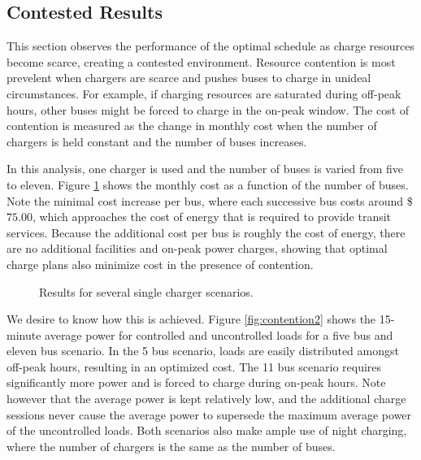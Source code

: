 \subsection{Contested Results}
This section observes the performance of the optimal schedule as charge resources become scarce, creating a contested environment. Resource contention is most prevelent when chargers are scarce and pushes buses to charge in unideal circumstances.  For example, if charging resources are saturated during off-peak hours, other buses might be forced to charge in the on-peak window. The cost of contention is measured as the change in monthly cost when the number of chargers is held constant and the number of buses increases. 
\par In this analysis, one charger is used and the number of buses is varied from five to eleven. Figure \ref{fig:contention1} shows the monthly cost as a function of the number of buses. Note the minimal cost increase per bus, where each successive bus costs around \$$75.00$, which approaches the cost of energy that is required to provide transit services.  Because the additional cost per bus is roughly the cost of energy, there are no additional facilities and on-peak power charges, showing that optimal charge plans also minimize cost in the presence of contention.
\begin{figure}
	\caption{Results for several single charger scenarios.}
	\label{fig:contention1}
\end{figure}
\par We desire to know how this is achieved. Figure \ref{fig:contention2} shows the 15-minute average power for controlled and uncontrolled loads for a five bus and eleven bus scenario. In the 5 bus scenario, loads are easily distributed amongst off-peak hours, resulting in an optimized cost.  The 11 bus scenario requires significantly more power and is forced to charge during on-peak hours.  Note however that the average power is kept relatively low, and the additional charge sessions never cause the average power to supersede the maximum average power of the uncontrolled loads. Both scenarios also make ample use of night charging, where the number of chargers is the same as the number of buses.  
\begin{figure*}
	\centering
	\caption{Comparison of the loads for a 5 and 11 bus scenario with one overhead charger} 
	\label{fig:contention2}
\end{figure*}

